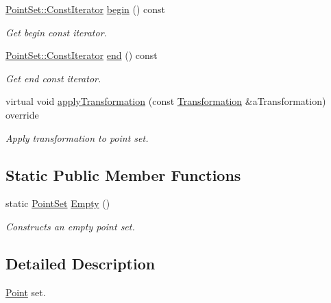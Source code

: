 \begin{DoxyCompactItemize}
\hyperlink{classostk_1_1math_1_1geom_1_1d3_1_1objects_1_1_point_set_aa87eb9a571cb8b420e8c404005a2b723}{Point\+Set\+::\+Const\+Iterator} \hyperlink{classostk_1_1math_1_1geom_1_1d3_1_1objects_1_1_point_set_ab660f9c1ab7ec392dce305a0d6cf72a5}{begin} () const
\begin{DoxyCompactList}\small\item\em Get begin const iterator. \end{DoxyCompactList}\item 
\hyperlink{classostk_1_1math_1_1geom_1_1d3_1_1objects_1_1_point_set_aa87eb9a571cb8b420e8c404005a2b723}{Point\+Set\+::\+Const\+Iterator} \hyperlink{classostk_1_1math_1_1geom_1_1d3_1_1objects_1_1_point_set_ad15fd1b2a3609d6e24657118945b579f}{end} () const
\begin{DoxyCompactList}\small\item\em Get end const iterator. \end{DoxyCompactList}\item 
virtual void \hyperlink{classostk_1_1math_1_1geom_1_1d3_1_1objects_1_1_point_set_af03e071aa9d7a364a0c76f563b65a57e}{apply\+Transformation} (const \hyperlink{classostk_1_1math_1_1geom_1_1d3_1_1_transformation}{Transformation} \&a\+Transformation) override
\begin{DoxyCompactList}\small\item\em Apply transformation to point set. \end{DoxyCompactList}\end{DoxyCompactItemize}
\subsection*{Static Public Member Functions}
\begin{DoxyCompactItemize}
\item 
static \hyperlink{classostk_1_1math_1_1geom_1_1d3_1_1objects_1_1_point_set}{Point\+Set} \hyperlink{classostk_1_1math_1_1geom_1_1d3_1_1objects_1_1_point_set_a1b14ed7d73ee7ac5e2796cf44f06ffe9}{Empty} ()
\begin{DoxyCompactList}\small\item\em Constructs an empty point set. \end{DoxyCompactList}\end{DoxyCompactItemize}


\subsection{Detailed Description}
\hyperlink{classostk_1_1math_1_1geom_1_1d3_1_1objects_1_1_point}{Point} set. 

